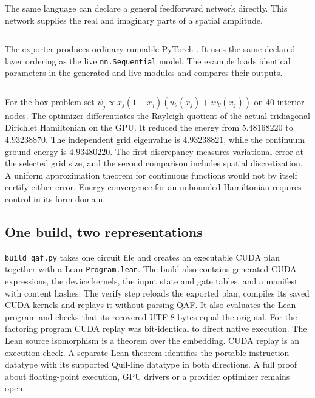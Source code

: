 The same language can declare a general feedforward network directly. This network supplies the real and imaginary parts of a spatial amplitude.
\inputminted{qaf}{examples/prefix/wave_net.qaf}
The exporter produces ordinary runnable PyTorch \cite{torch}. It uses the same declared layer ordering as the live \texttt{nn.Sequential} model. The example loads identical parameters in the generated and live modules and compares their outputs.
\inputminted[fontsize=\footnotesize]{python}{examples/wave_net.py}
For the box problem set $\psi_j\propto x_j(1-x_j)(u_\theta(x_j)+i v_\theta(x_j))$ on 40 interior nodes. The optimizer differentiates the Rayleigh quotient of the actual tridiagonal Dirichlet Hamiltonian on the GPU. It reduced the energy from $5.48168220$ to $4.93238870$. The independent grid eigenvalue is $4.93238821$, while the continuum ground energy is $4.93480220$. The first discrepancy measures variational error at the selected grid size, and the second comparison includes spatial discretization. A uniform approximation theorem for continuous functions would not by itself certify either error. Energy convergence for an unbounded Hamiltonian requires control in its form domain.

\subsection{One build, two representations}
\texttt{build\_qaf.py} takes one circuit file and creates an executable CUDA plan together with a Lean \texttt{Program.lean}. The build also contains generated CUDA expressions, the device kernels, the input state and gate tables, and a manifest with content hashes. The verify step reloads the exported plan, compiles its saved CUDA kernels and replays it without parsing QAF. It also evaluates the Lean program and checks that its recovered UTF-8 bytes equal the original. For the factoring program CUDA replay was bit-identical to direct native execution. The Lean source isomorphism is a theorem over the embedding. CUDA replay is an execution check. A separate Lean theorem identifies the portable instruction datatype with its supported Quil-line datatype in both directions. A full proof about floating-point execution, GPU drivers or a provider optimizer remains open.
